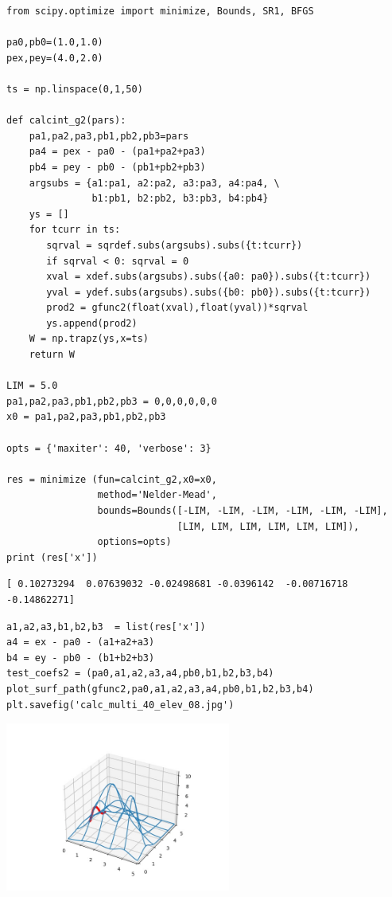 \documentclass[12pt,fleqn]{article}\usepackage{../../common}
\begin{document}
\begin{verbatim}
from scipy.optimize import minimize, Bounds, SR1, BFGS

pa0,pb0=(1.0,1.0)
pex,pey=(4.0,2.0)

ts = np.linspace(0,1,50)

def calcint_g2(pars):
    pa1,pa2,pa3,pb1,pb2,pb3=pars
    pa4 = pex - pa0 - (pa1+pa2+pa3)
    pb4 = pey - pb0 - (pb1+pb2+pb3)
    argsubs = {a1:pa1, a2:pa2, a3:pa3, a4:pa4, \
               b1:pb1, b2:pb2, b3:pb3, b4:pb4}
    ys = []
    for tcurr in ts:
       sqrval = sqrdef.subs(argsubs).subs({t:tcurr})
       if sqrval < 0: sqrval = 0    
       xval = xdef.subs(argsubs).subs({a0: pa0}).subs({t:tcurr})
       yval = ydef.subs(argsubs).subs({b0: pb0}).subs({t:tcurr})
       prod2 = gfunc2(float(xval),float(yval))*sqrval
       ys.append(prod2)
    W = np.trapz(ys,x=ts)
    return W
    
LIM = 5.0
pa1,pa2,pa3,pb1,pb2,pb3 = 0,0,0,0,0,0
x0 = pa1,pa2,pa3,pb1,pb2,pb3

opts = {'maxiter': 40, 'verbose': 3}

res = minimize (fun=calcint_g2,x0=x0,
                method='Nelder-Mead',
                bounds=Bounds([-LIM, -LIM, -LIM, -LIM, -LIM, -LIM],
                              [LIM, LIM, LIM, LIM, LIM, LIM]),
                options=opts)
print (res['x'])
\end{verbatim}

\begin{verbatim}
[ 0.10273294  0.07639032 -0.02498681 -0.0396142  -0.00716718 -0.14862271]
\end{verbatim}

\begin{verbatim}
a1,a2,a3,b1,b2,b3  = list(res['x'])
a4 = ex - pa0 - (a1+a2+a3)
b4 = ey - pb0 - (b1+b2+b3)
test_coefs2 = (pa0,a1,a2,a3,a4,pb0,b1,b2,b3,b4)
plot_surf_path(gfunc2,pa0,a1,a2,a3,a4,pb0,b1,b2,b3,b4)
plt.savefig('calc_multi_40_elev_08.jpg')
\end{verbatim}

\includegraphics[width=20em]{calc_multi_40_elev_08.jpg}
\end{document}
